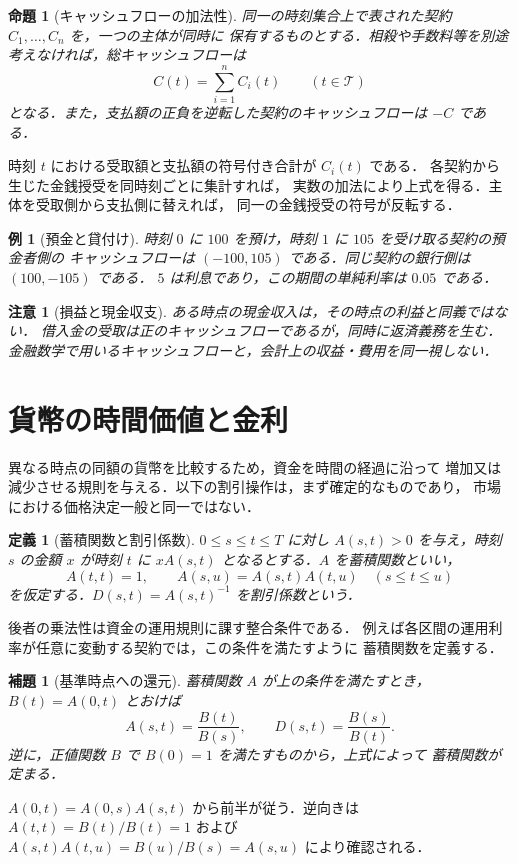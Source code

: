 \documentclass[a5paper,10pt,onecolumn]{jsarticle}
\makeatletter
\theoremstyle{mathnotetheorem}
\newtheorem{definition}[theorem]{定義}
\newtheorem{lemma}[theorem]{補題}
\newtheorem{proposition}[theorem]{命題}
\newtheorem{example}[theorem]{例}
\newtheorem{remark}[theorem]{注意}
\renewcommand{\proofname}{証明}
\renewenvironment{proof}[1][\proofname]{%
  \par\pushQED{\qed}\normalfont\topsep4\p@\@plus2\p@\relax
  \trivlist\item[\hskip\labelsep\bfseries #1]\ignorespaces
}{\popQED\endtrivlist\@endpefalse}
\makeatother
\begin{document}
\begin{proposition}[キャッシュフローの加法性]\label{prop:cfadd}
同一の時刻集合上で表された契約 $C_1,\ldots,C_n$ を，一つの主体が同時に
保有するものとする．相殺や手数料等を別途考えなければ，総キャッシュフローは
\[
 C(t)=\sum_{i=1}^n C_i(t)\qquad(t\in\mathcal T)
\]
となる．また，支払額の正負を逆転した契約のキャッシュフローは $-C$ である．
\end{proposition}
\begin{proof}
時刻 $t$ における受取額と支払額の符号付き合計が $C_i(t)$ である．
各契約から生じた金銭授受を同時刻ごとに集計すれば，
実数の加法により上式を得る．主体を受取側から支払側に替えれば，
同一の金銭授受の符号が反転する．\end{proof}

\begin{example}[預金と貸付け]
時刻 $0$ に $100$ を預け，時刻 $1$ に $105$ を受け取る契約の預金者側の
キャッシュフローは $(-100,105)$ である．同じ契約の銀行側は $(100,-105)$ である．
$5$ は利息であり，この期間の単純利率は $0.05$ である．
\end{example}

\begin{remark}[損益と現金収支]
ある時点の現金収入は，その時点の利益と同義ではない．
借入金の受取は正のキャッシュフローであるが，同時に返済義務を生む．
金融数学で用いるキャッシュフローと，会計上の収益・費用を同一視しない．
\end{remark}

\section{貨幣の時間価値と金利}

異なる時点の同額の貨幣を比較するため，資金を時間の経過に沿って
増加又は減少させる規則を与える．以下の割引操作は，まず確定的なものであり，
市場における価格決定一般と同一ではない．

\begin{definition}[蓄積関数と割引係数]
$0\le s\le t\le T$ に対し $A(s,t)>0$ を与え，時刻 $s$ の金額 $x$ が時刻 $t$ に
$xA(s,t)$ となるとする．$A$ を\emph{蓄積関数}といい，
\[
 A(t,t)=1,\qquad A(s,u)=A(s,t)A(t,u)\quad(s\le t\le u)
\]
を仮定する．$D(s,t)=A(s,t)^{-1}$ を\emph{割引係数}という．
\end{definition}

後者の乗法性は資金の運用規則に課す整合条件である．
例えば各区間の運用利率が任意に変動する契約では，この条件を満たすように
蓄積関数を定義する．

\begin{lemma}[基準時点への還元]\label{lem:bank}
蓄積関数 $A$ が上の条件を満たすとき，$B(t)=A(0,t)$ とおけば
\[
 A(s,t)=\frac{B(t)}{B(s)},\qquad D(s,t)=\frac{B(s)}{B(t)}.
\]
逆に，正値関数 $B$ で $B(0)=1$ を満たすものから，上式によって
蓄積関数が定まる．
\end{lemma}
\begin{proof}
$A(0,t)=A(0,s)A(s,t)$ から前半が従う．逆向きは
$A(t,t)=B(t)/B(t)=1$ および
$A(s,t)A(t,u)=B(u)/B(s)=A(s,u)$ により確認される．\end{proof}
\end{document}
